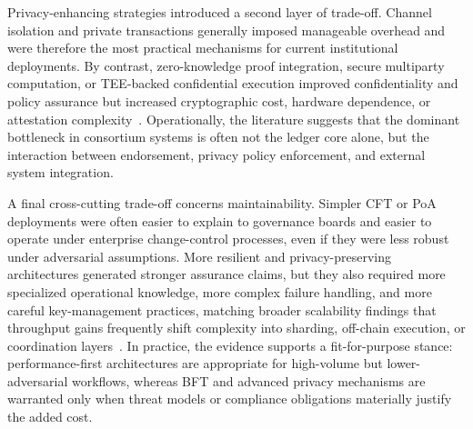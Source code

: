 \documentclass[journal]{IEEEtran}
\begin{document}
Privacy-enhancing strategies introduced a second layer of trade-off. Channel isolation and private transactions generally imposed manageable overhead and were therefore the most practical mechanisms for current institutional deployments. By contrast, zero-knowledge proof integration, secure multiparty computation, or TEE-backed confidential execution improved confidentiality and policy assurance but increased cryptographic cost, hardware dependence, or attestation complexity~\cite{benhamouda2020can,cheng2019ekiden,zhang2021surveytee}. Operationally, the literature suggests that the dominant bottleneck in consortium systems is often not the ledger core alone, but the interaction between endorsement, privacy policy enforcement, and external system integration.

A final cross-cutting trade-off concerns maintainability. Simpler CFT or PoA deployments were often easier to explain to governance boards and easier to operate under enterprise change-control processes, even if they were less robust under adversarial assumptions. More resilient and privacy-preserving architectures generated stronger assurance claims, but they also required more specialized operational knowledge, more complex failure handling, and more careful key-management practices, matching broader scalability findings that throughput gains frequently shift complexity into sharding, off-chain execution, or coordination layers~\cite{zhou2020solutions}. In practice, the evidence supports a fit-for-purpose stance: performance-first architectures are appropriate for high-volume but lower-adversarial workflows, whereas BFT and advanced privacy mechanisms are warranted only when threat models or compliance obligations materially justify the added cost.
\end{document}
